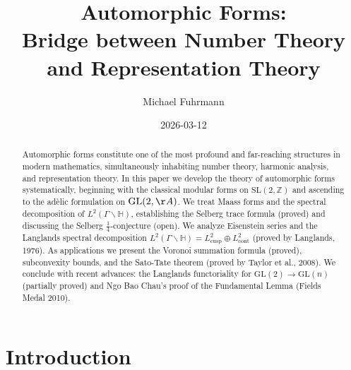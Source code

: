 \documentclass[12pt,a4paper]{amsart}
\theoremstyle{definition}
\newcommand{\HH}{\mathbb{H}}
\newcommand{\ZZ}{\mathbb{Z}}
\newcommand{\GL}{\mathrm{GL}}
\newcommand{\SL}{\mathrm{SL}}
\begin{document}
\title{Automorphic Forms:\\
Bridge between Number Theory and Representation Theory}

\author{Michael Fuhrmann}

\address{Specialist Mathematics Project, Build 143}


\date{2026-03-12}



\begin{abstract}
Automorphic forms constitute one of the most profound and far-reaching structures
in modern mathematics, simultaneously inhabiting number theory, harmonic analysis,
and representation theory. In this paper we develop the theory of automorphic forms
systematically, beginning with the classical modular forms on $\SL(2,\ZZ)$ and
ascending to the adèlic formulation on $\GL(2,\AA)$. We treat Maass forms and the
spectral decomposition of $L^2(\Gamma \backslash \HH)$, establishing the Selberg
trace formula (proved) and discussing the Selberg $\tfrac{1}{4}$-conjecture
(open). We analyze Eisenstein series and the Langlands spectral decomposition
$L^2(\Gamma \backslash \HH) = L^2_{\mathrm{cusp}} \oplus L^2_{\mathrm{cont}}$
(proved by Langlands, 1976). As applications we present the Voronoi summation
formula (proved), subconvexity bounds, and the Sato-Tate theorem (proved by
Taylor et al., 2008). We conclude with recent advances: the Langlands functoriality
for $\GL(2) \to \GL(n)$ (partially proved) and Ngo Bao Chau's proof of the
Fundamental Lemma (Fields Medal 2010).
\end{abstract}

\maketitle

\section{Introduction}
\label{sec:intro}
\end{document}
